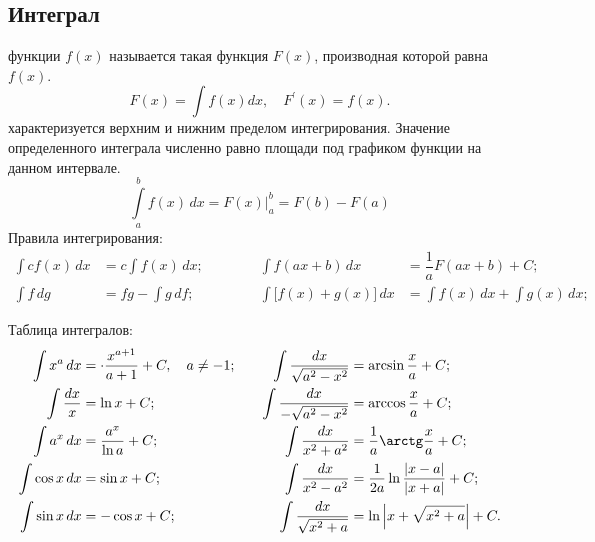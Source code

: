 \subsection{Интеграл}
 функции $f(x)$ называется такая функция $F(x)$, производная которой равна $f(x)$.
\begin{equation}
F(x) = \int f(x)dx,\quad F^\prime(x)=f(x).
\end{equation}
 характеризуется верхним и нижним пределом интегрирования. Значение определенного интеграла численно равно площади под графиком функции на данном интервале.
\begin{equation}
\int\limits^b_a f(x)\,dx = F(x) \biggr|^b_a = F(b) - F(a)
\end{equation}
Правила интегрирования:
\begin{align*}	
\int c f(x) \,dx &= c \int f(x) \,dx;  &&&&&\int f(ax + b) \,dx &= \dfrac{1}{a}F(ax + b) + C;\\
\int f \,dg &= fg - \int g \,df; &&&&& \int \bigl[f(x) + g(x)\bigr] \,dx &= \int f(x) \,dx + \int g(x) \,dx;
\end{align*}

Таблица интегралов:
\begin{align*}
\int  x^a \,dx &= \cdot \dfrac{x^{a+1}}{a+1} + C,\quad a \neq -1;\quad & 
\int \dfrac{dx}{\sqrt{a^2 - x^2}} &= \arcsin\dfrac{x}{a} + C;\\
\int \frac{dx}{x} &= \ln x + C; &
\int \dfrac{dx}{-\sqrt{a^2 - x^2}} &= \arccos\dfrac{x}{a} + C;\\
\int a^x \,dx &= \dfrac{a^x}{\ln a} + C; & 
\int \dfrac{dx}{x^2 + a^2} &= \dfrac{1}{a} \arctg \dfrac{x}{a} + C; \\
\int \cos x \,dx &= \sin x + C; & 
\int \dfrac{dx}{x^2 - a^2} &= \dfrac{1}{2a} \ln \dfrac{|x - a|}{|x + a|} + C;\\
\int \sin x \,dx &= -\cos x + C; &
\int \dfrac{dx}{\sqrt{x^2 + a}} &= \ln \left| x + \sqrt{x^2 + a} \right| + C.
\end{align*}